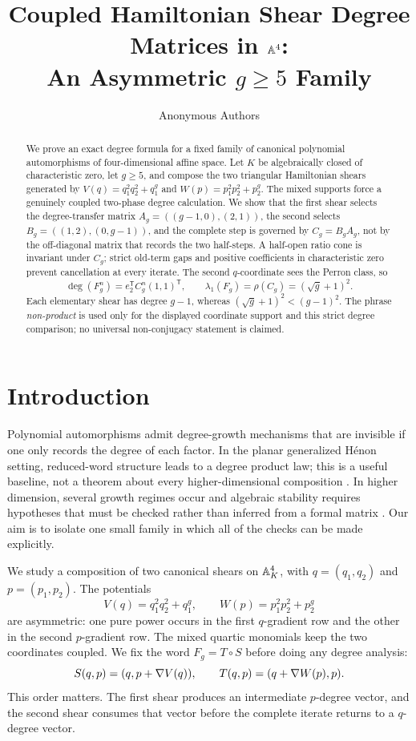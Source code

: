 \documentclass[11pt]{article}
\title{\textbf{Coupled Hamiltonian Shear Degree Matrices in \(\mathbb{A}^4\):}\\
An Asymmetric \(g\geq 5\) Family}
\author{Anonymous Authors}
\date{}
\theoremstyle{remark}
\numberwithin{equation}{section}
\begin{document}
\maketitle

\begin{abstract}
We prove an exact degree formula for a fixed family of canonical polynomial
automorphisms of four-dimensional affine space.  Let \(K\) be algebraically
closed of characteristic zero, let \(g\geq5\), and compose the two triangular
Hamiltonian shears generated by
\(V(q)=q_1^2q_2^2+q_1^g\) and
\(W(p)=p_1^2p_2^2+p_2^g\).
The mixed supports force a genuinely coupled two-phase degree calculation.
We show that the first shear selects the degree-transfer matrix
\(A_g=((g-1,0),(2,1))\), the second selects
\(B_g=((1,2),(0,g-1))\), and the complete step is governed by
\(C_g=B_gA_g\), not by the off-diagonal matrix that records the two half-steps.
A half-open ratio cone is invariant under \(C_g\); strict old-term gaps and
positive coefficients in characteristic zero prevent cancellation at every
iterate.  The second \(q\)-coordinate sees the Perron class, so
\[
 \deg(F_g^n)=e_2^{\mathsf T}C_g^n(1,1)^{\mathsf T},
 \qquad
 \lambda_1(F_g)=\rho(C_g)=(\sqrt g+1)^2.
\]
Each elementary shear has degree \(g-1\), whereas
\((\sqrt g+1)^2<(g-1)^2\).  The phrase \emph{non-product} is used only for the
displayed coordinate support and this strict degree comparison; no universal
non-conjugacy statement is claimed.
\end{abstract}

\section{Introduction}\label{sec:introduction}

Polynomial automorphisms admit degree-growth mechanisms that are invisible if
one only records the degree of each factor.  In the planar generalized Hénon
setting, reduced-word structure leads to a degree product law; this is a useful
baseline, not a theorem about every higher-dimensional composition
\citep{FriedlandMilnor1989,HenonSurvey2024}.  In higher dimension, several
growth regimes occur and algebraic stability requires hypotheses that must be
checked rather than inferred from a formal matrix
\citep{Deserti2018,GuedjSibony2002,FavreJonsson2011,DangFavre2021}.  Our aim is
to isolate one small family in which all of the checks can be made explicitly.

We study a composition of two canonical shears on
\(\mathbb{A}^4_K\), with \(q=(q_1,q_2)\) and \(p=(p_1,p_2)\).  The potentials
\[
 V(q)=q_1^2q_2^2+q_1^g,\qquad
 W(p)=p_1^2p_2^2+p_2^g
\]
are asymmetric: one pure power occurs in the first \(q\)-gradient row and the
other in the second \(p\)-gradient row.  The mixed quartic monomials keep the
two coordinates coupled.  We fix the word \(F_g=T\circ S\) before doing any
degree analysis:
\[
 S(q,p)=(q,p+\nabla V(q)),\qquad
 T(q,p)=(q+\nabla W(p),p).
\]
This order matters.  The first shear produces an intermediate \(p\)-degree
vector, and the second shear consumes that vector before the complete iterate
returns to a \(q\)-degree vector.
\end{document}
